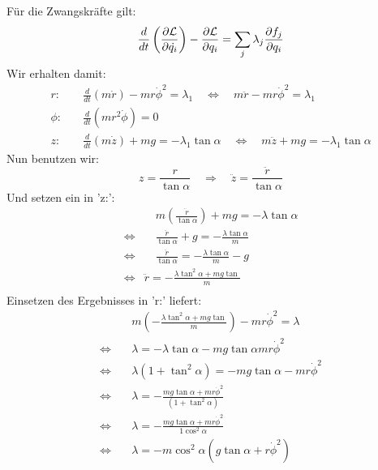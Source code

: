 \documentclass[a4paper,german,12pt,smallheadings]{scrartcl}
\begin{document}
Für die Zwangskräfte gilt:
\begin{equation*}
\frac{d}{dt}\left(\frac{\partial \mathcal{L}}{\partial \dot{q_i}}\right)-\frac{\partial \mathcal{L}}{\partial q_i}=\sum\limits_j \lambda_j \frac{\partial f_j}{\partial q_i}\\
\end{equation*}
Wir erhalten damit:
\begin{align*}
r: & \quad \frac{d}{dt}\left(m\dot{r}\right)-mr\dot{\phi}^2=\lambda_1 \quad \Leftrightarrow \quad m\ddot{r}-mr\dot{\phi}^2=\lambda_1\\
\phi: & \quad \frac{d}{dt}\left(mr^2\dot{\phi}\right)=0\\
z: & \quad \frac{d}{dt}\left(m\dot{z}\right)+mg=-\lambda_1 \tan \alpha \quad \Leftrightarrow \quad m\ddot{z}+mg=-\lambda_1 \tan \alpha
\end{align*}
Nun benutzen wir:
\begin{equation}
z=\frac{r}{\tan \alpha} \quad \Rightarrow \quad \ddot{z}=\frac{\ddot{r}}{\tan \alpha}
\end{equation}
Und setzen ein in 'z:':
\begin{align*}
& \quad m\left(\frac{\ddot{r}}{\tan \alpha}\right) +mg=-\lambda \tan \alpha\\
\Leftrightarrow & \quad \frac{\ddot{r}}{\tan \alpha}+g=-\frac{\lambda \tan \alpha}{m}\\
\Leftrightarrow & \quad \frac{\ddot{r}}{\tan \alpha}=-\frac{\lambda \tan \alpha}{m}-g\\
\Leftrightarrow & \ddot{r}=-\frac{\lambda \tan^2 \alpha +mg \tan}{m}\\
\end{align*}
Einsetzen des Ergebnisses in 'r:' liefert:\\
\begin{align*}
& \quad m \left(-\frac{\lambda \tan^2 \alpha +mg \tan}{m}\right) -mr \dot{\phi}^2=\lambda\\
\Leftrightarrow & \quad \lambda=-\lambda \tan \alpha -mg \tan \alpha m r \dot{\phi}^2\\
\Leftrightarrow & \quad \lambda\left(1+\tan^2 \alpha\right)=-mg \tan \alpha -mr \dot{\phi}^2\\
\Leftrightarrow & \quad \lambda=-\frac{mg \tan \alpha + mr \dot{\phi}^2}{\left(1+\tan^2 \alpha\right)}\\
\Leftrightarrow & \quad \lambda=-\frac{mg \tan \alpha + mr \dot{\phi}^2}{1\cos^2 \alpha}\\
\Leftrightarrow & \quad \lambda=-m \cos^2 \alpha \left(g \tan \alpha + r \dot{\phi}^2 \right)
\end{align*}
\end{document}
